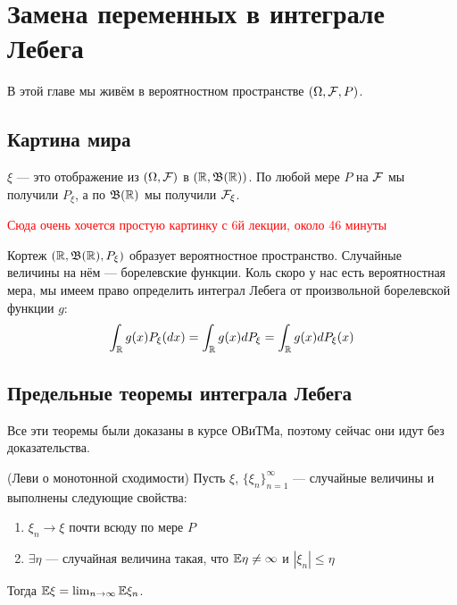 \section{Замена переменных в интеграле Лебега}

\begin{note}
	В этой главе мы живём в вероятностном пространстве $(\Omega, \mathcal{F}, P)$.
\end{note}

\subsection{Картина мира}

\begin{note}
	$\xi$ --- это отображение из $(\Omega, \mathcal{F})$ в $(\mathbb{R}, \mathfrak{B}(\mathbb{R}))$. По любой мере $P$ на $\mathcal{F}$ мы получили $P_\xi$, а по $\mathfrak{B}(\mathbb{R})$ мы получили $\mathcal{F}_\xi$.
	
	\textcolor{red}{Сюда очень хочется простую картинку с 6й лекции, около 46 минуты}
	
	Кортеж $(\mathbb{R}, \mathfrak{B}(\mathbb{R}), P_\xi)$ образует вероятностное пространство. Случайные величины на нём --- борелевские функции. Коль скоро у нас есть вероятностная мера, мы имеем право определить интеграл Лебега от произвольной борелевской функции $g$:
	\[
		\int_{\mathbb{R}} g(x)P_\xi(dx) = \int_{\mathbb{R}} g(x)dP_\xi = \int_{\mathbb{R}} g(x)dP_\xi(x)
	\]
\end{note}

\subsection{Предельные теоремы интеграла Лебега}

\begin{note}
	Все эти теоремы были доказаны в курсе ОВиТМа, поэтому сейчас они идут без доказательства.
\end{note}

\begin{theorem} (Леви о монотонной сходимости)
	Пусть $\xi$, $\{\xi_n\}_{n = 1}^\infty$ --- случайные величины и выполнены следующие свойства:
	\begin{enumerate}
		\item $\xi_n \to \xi$ почти всюду по мере $P$
		
		\item $\exists \eta$ --- случайная величина такая, что $\mathbb{E}\eta \neq \infty$ и $|\xi_n| \le \eta$
	\end{enumerate}
	Тогда $\mathbb{E}\xi = \lim_{n \to \infty} \mathbb{E}\xi_n$.
\end{theorem}

